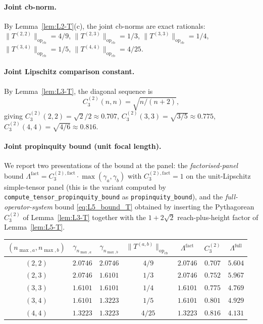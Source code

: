 \documentclass[11pt,a4paper]{article}
\theoremstyle{plain}
\theoremstyle{definition}
\newcommand{\nmaxa}{n_{\max,a}}
\newcommand{\nmaxb}{n_{\max,b}}
\newcommand{\opnorm}[1]{\lVert #1 \rVert_{\mathrm{op}}}
\begin{document}
\paragraph{Joint cb-norm.} By Lemma~\ref{lem:L2-T}(c), the joint
cb-norms are exact rationals:
$\opnorm{T^{(2,2)}}_{\mathrm{cb}} = 4/9$,
$\opnorm{T^{(2,3)}}_{\mathrm{cb}} = 1/3$,
$\opnorm{T^{(3,3)}}_{\mathrm{cb}} = 1/4$,
$\opnorm{T^{(3,4)}}_{\mathrm{cb}} = 1/5$,
$\opnorm{T^{(4,4)}}_{\mathrm{cb}} = 4/25$.

\paragraph{Joint Lipschitz comparison constant.} By
Lemma~\ref{lem:L3-T}, the diagonal sequence is
\[
C_3^{(2)}(n,n) = \sqrt{n/(n+2)},
\]
giving $C_3^{(2)}(2,2) = \sqrt{2}/2 \approx 0.707$,
$C_3^{(2)}(3,3) = \sqrt{3/5} \approx 0.775$,
$C_3^{(2)}(4,4) = \sqrt{4/6} \approx 0.816$.

\paragraph{Joint propinquity bound (unit focal length).}
We report two presentations of the bound at the panel: the
\emph{factorised-panel} bound $\Lambda^{\mathrm{fact}} =
C_3^{(2),\mathrm{fact}} \cdot \max(\gamma_a, \gamma_b)$ with
$C_3^{(2),\mathrm{fact}} = 1$ on the unit-Lipschitz simple-tensor panel
(this is the variant computed by
\texttt{compute\_tensor\_propinquity\_bound} as
\texttt{propinquity\_bound}), and the \emph{full-operator-system} bound
\eqref{eq:L5_bound_T} obtained by inserting the Pythagorean
$C_3^{(2)}$ of Lemma~\ref{lem:L3-T} together with the
$1 + 2\sqrt{2}$ reach-plus-height factor of Lemma~\ref{lem:L5-T}.

\begin{center}
\begin{tabular}{ccccccc}
\toprule
$(\nmaxa, \nmaxb)$ & $\gamma_{\nmaxa}$ & $\gamma_{\nmaxb}$ &
$\opnorm{T^{(a,b)}}_{\mathrm{cb}}$ & $\Lambda^{\mathrm{fact}}$ &
$C_3^{(2)}$ & $\Lambda^{\mathrm{full}}$ \\
\midrule
$(2, 2)$ & $2.0746$ & $2.0746$ & $4/9$ & $2.0746$ & $0.707$ & $5.604$ \\
$(2, 3)$ & $2.0746$ & $1.6101$ & $1/3$ & $2.0746$ & $0.752$ & $5.967$ \\
$(3, 3)$ & $1.6101$ & $1.6101$ & $1/4$ & $1.6101$ & $0.775$ & $4.769$ \\
$(3, 4)$ & $1.6101$ & $1.3223$ & $1/5$ & $1.6101$ & $0.801$ & $4.929$ \\
$(4, 4)$ & $1.3223$ & $1.3223$ & $4/25$ & $1.3223$ & $0.816$ & $4.131$ \\
\bottomrule
\end{tabular}
\end{center}
\end{document}
